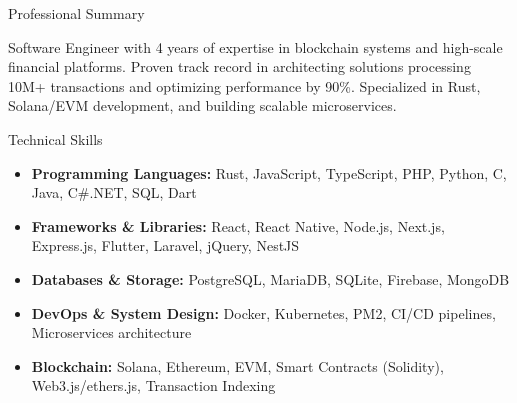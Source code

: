 \documentclass[]{mcdowellcv}
\begin{document}
	\makeheader
	
	\begin{cvsection}{Professional Summary}
		\begin{cvsubsection}{}{}{}
      Software Engineer with 4 years of expertise in blockchain systems and high-scale financial platforms. Proven track record in architecting solutions processing 10M+ transactions and optimizing performance by 90\%. Specialized in Rust, Solana/EVM development, and building scalable microservices.
    \end{cvsubsection}
	\end{cvsection}

	\begin{cvsection}{Technical Skills}
		\begin{cvsubsection}{}{}{}	
			\begin{itemize}
        \item \textbf{Programming Languages:} Rust, JavaScript, TypeScript, PHP, Python, C, Java, C\#.NET, SQL, Dart
				\item \textbf{Frameworks \& Libraries:} React, React Native, Node.js, Next.js, Express.js, Flutter, Laravel, jQuery, NestJS
				\item \textbf{Databases \& Storage:} PostgreSQL, MariaDB, SQLite, Firebase, MongoDB
				\item \textbf{DevOps \& System Design:} Docker, Kubernetes, PM2, CI/CD pipelines, Microservices architecture
        \item \textbf{Blockchain:} Solana, Ethereum, EVM, Smart Contracts (Solidity), Web3.js/ethers.js, Transaction Indexing
      \end{itemize}
		\end{cvsubsection}
	\end{cvsection}
	
\end{document}
